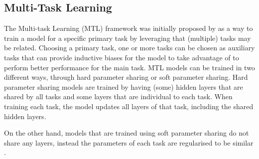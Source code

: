 \subsection{Multi-Task Learning}\label{sub:mtl}
The Multi-task Learning (MTL) framework was initially proposed by \citet{Caruana:1993} as a way to train a model for a specific primary task by leveraging that (multiple) tasks may be related.
Choosing a primary task, one or more tasks can be chosen as auxiliary tasks that can provide inductive biases for the model to take advantage of to perform better performance for the main task.
MTL models can be trained in two different ways, through hard parameter sharing or soft parameter sharing.
Hard parameter sharing models are trained by having (some) hidden layers that are shared by all tasks and some layers that are individual to each task.
When training each task, the model updates all layers of that task, including the shared hidden layers.

On the other hand, models that are trained using soft parameter sharing do not share any layers, instead the parameters of each task are regularised to be similar \citep{Duong:2015}.
%

